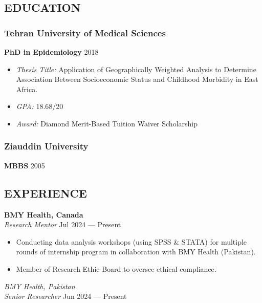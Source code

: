 \documentclass[
  letterpaper,
  DIV=11,
  numbers=noendperiod]{scrartcl}
\author{Owais Raza}
\date{}
\providecommand{\tightlist}{%
  \setlength{\itemsep}{0pt}\setlength{\parskip}{0pt}}\usepackage{longtable,booktabs,array}
\begin{document}
\subsection{EDUCATION}\label{education}

\subsubsection{\texorpdfstring{{Tehran University of Medical
Sciences}}{Tehran University of Medical Sciences}}\label{tehran-university-of-medical-sciences}

\textbf{PhD in Epidemiology} {2018}

\begin{itemize}
\tightlist
\item
  \emph{Thesis Title:} Application of Geographically Weighted Analysis
  to Determine Association Between Socioeconomic Status and Childhood
  Morbidity in East Africa.\\
\item
  \emph{GPA:} 18.68/20\\
\item
  \emph{Award:} Diamond Merit-Based Tuition Waiver Scholarship
\end{itemize}

\subsubsection{\texorpdfstring{{Ziauddin
University}}{Ziauddin University}}\label{ziauddin-university}

\textbf{MBBS} {2005}

\subsection{EXPERIENCE}\label{experience}

\textbf{{BMY Health, Canada}}\\
\emph{Research Mentor} {Jul 2024 --- Present}

\begin{itemize}
\item
  Conducting data analysis workshops (using SPSS \& STATA) for multiple
  rounds of internship program in collaboration with BMY Health
  (Pakistan).
\item
  Member of Research Ethic Board to oversee ethical compliance.
\end{itemize}

\emph{{BMY Health, Pakistan}}\\
\emph{Senior Researcher} {Jun 2024 --- Present}
\end{document}
